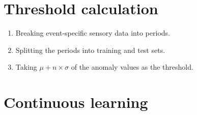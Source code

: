 \documentclass[a4paper]{article}
\begin{document}
   \section{Threshold calculation} \label{anomaly_calculation}
      \begin{enumerate}
         \item Breaking event-specific sensory data into periods.
         \item Splitting the periods into training and test sets.
         \item Taking $\mu + n \times \sigma$ of the anomaly values as the threshold.
      \end{enumerate}

   \section{Continuous learning}


      
      
\end{document}
